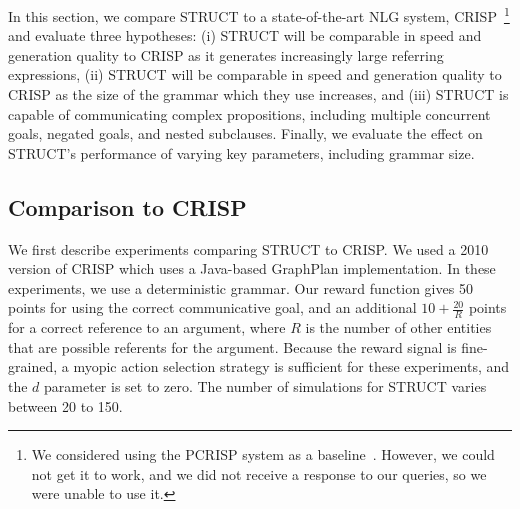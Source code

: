 In this section, we compare STRUCT to a state-of-the-art NLG system,
CRISP~\footnote{We considered using the PCRISP system as a
  baseline~\cite{bauer_sentence_2010}. However, we could not get it to
  work, and we did not receive a response to our queries, so we were
  unable to use it.} 
and evaluate three hypotheses: (i) STRUCT will be
comparable in speed and generation quality to CRISP as it generates
increasingly large referring expressions, (ii) STRUCT will be
comparable in speed and generation quality to CRISP as the size of the
grammar which they use increases, and (iii) STRUCT is capable of
communicating complex propositions, including multiple concurrent
goals, negated goals, and nested subclauses.
Finally, we evaluate the effect on STRUCT's performance 
of varying key parameters, including grammar size.

\subsection{Comparison to CRISP}

We first describe experiments comparing STRUCT to CRISP. We used a
2010 version of CRISP  which uses a Java-based GraphPlan
implementation. In these
experiments, we use a deterministic grammar.  Our reward function
gives 50 points for using the correct communicative goal, and an
additional $10 + \frac{20}{R}$ points for a correct reference to an
argument, where $R$ is the number of other entities that are possible
referents for the argument. Because the reward signal is fine-grained,
 a myopic action selection strategy is
sufficient for these experiments, and 
the $d$ parameter is set to zero. The
 number of simulations for STRUCT varies between 20 to 150.

